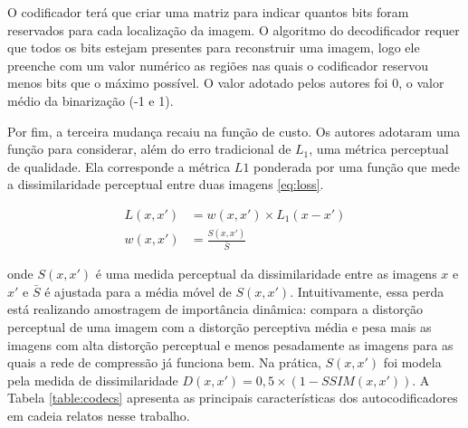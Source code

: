 O codificador terá que criar uma matriz para indicar quantos bits foram reservados para cada localização da imagem. O algoritmo do decodificador requer que todos os bits estejam presentes para reconstruir uma imagem, logo ele preenche com um valor numérico as regiões nas quais o codificador reservou menos bits que o máximo possível. O valor adotado pelos autores foi 0, o valor médio da binarização (-1 e 1). 


Por fim, a terceira mudança recaiu na função de custo. Os autores adotaram uma função para considerar, além do erro tradicional de $L_1$, uma métrica perceptual de qualidade. Ela corresponde a métrica $L1$ ponderada por uma função que mede a dissimilaridade perceptual entre duas imagens \ref{eq:loss}.    

\begin{equation}
\label{eq:loss}     
\begin{aligned}
L(x,x') &= w(x,x') \times L_1(x-x') \\ 
w(x,x') &= \frac{S(x,x')}{\bar{S}} 
\end{aligned}
\end{equation}

onde $S(x, x')$ é uma medida perceptual da dissimilaridade entre as imagens $x$ e $x'$ e  $\bar{S}$ é ajustada para a média móvel de $S(x,x')$. 
Intuitivamente, essa perda está realizando amostragem de importância dinâmica: compara a distorção perceptual de uma imagem com a distorção perceptiva média e pesa mais as imagens com alta distorção perceptual e menos pesadamente as imagens para as quais a rede de compressão já funciona bem.
Na prática, $S(x, x')$ foi modela pela medida de dissimilaridade $D(x, x') = 0,5 \times (1- SSIM (x, x'))$. 
A Tabela \ref{table:codecs} apresenta as principais características dos autocodificadores em cadeia relatos nesse trabalho.  



